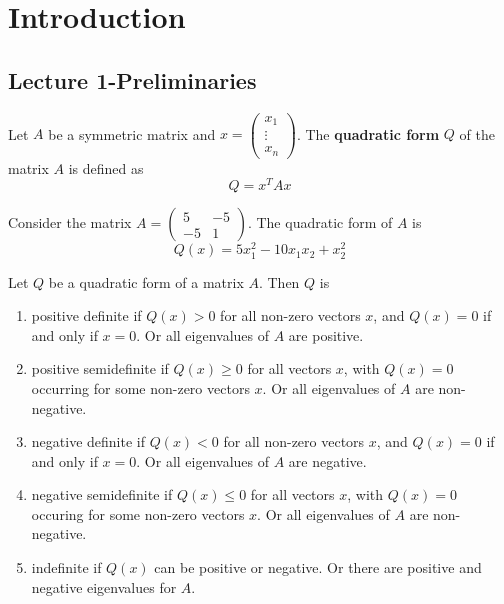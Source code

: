 
% 
\section{Introduction}
\subsection{Lecture 1-Preliminaries}
\begin{definition}
    Let $A$ be a symmetric matrix and $x = \begin{pmatrix}
        x_1 \\ \vdots \\ x_n
    \end{pmatrix}$. The \textbf{quadratic form} $Q$ of the matrix $A$ is defined as $$Q = x^T Ax$$
\end{definition}

\begin{problem}[Example]
    Consider the matrix $A = \begin{pmatrix}
        5 & -5 \\
        -5 & 1
    \end{pmatrix}$. The quadratic form of $A$ is $$Q(x) = 5x^2_1 - 10x_1x_2 + x^2_2$$
\end{problem}
\begin{definition}
    Let $Q$ be a quadratic form of a matrix $A$. Then $Q$ is
    \begin{enumerate}
        \item positive definite if $Q(x) > 0$ for all non-zero vectors $x$, and $Q(x) = 0$ if and only if $x = 0$. Or all eigenvalues of $A$ are positive.
        \item positive semidefinite if $Q(x) \geq 0$ for all vectors $x$, with $Q(x) = 0$ occurring for some non-zero vectors $x$. Or all eigenvalues of $A$ are non-negative.
        \item negative definite if $Q(x) < 0$ for all non-zero vectors $x$, and $Q(x) = 0$ if and only if $x = 0$. Or all eigenvalues of $A$ are negative.
        \item negative semidefinite if $Q(x) \leq 0$ for all vectors $x$, with $Q(x) = 0$ occuring for some non-zero vectors $x$. Or all eigenvalues of $A$ are non-negative.
        \item indefinite if $Q(x)$ can be positive or negative. Or there are positive and negative eigenvalues for $A$.
    \end{enumerate}
\end{definition}


